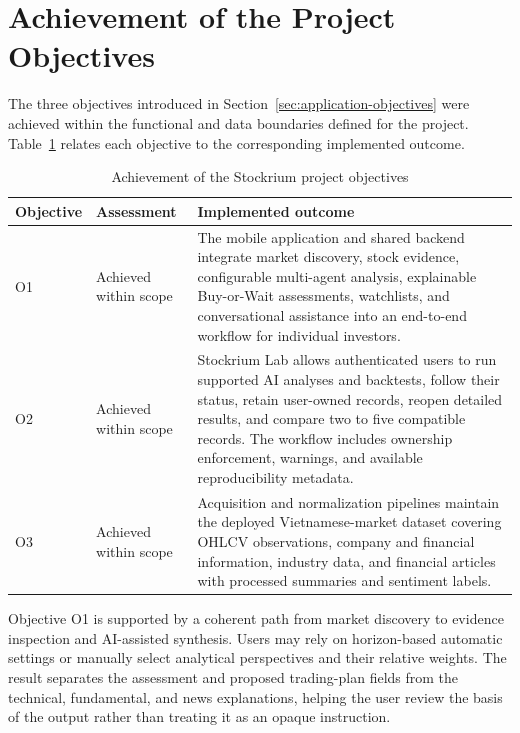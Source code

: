 \section{Achievement of the Project Objectives}
\label{sec:objective-achievement}

The three objectives introduced in Section~\ref{sec:application-objectives} were achieved within the functional and data boundaries defined for the project. Table~\ref{tab:objective-achievement} relates each objective to the corresponding implemented outcome.

\begin{table}[H]
    \centering
    \caption{Achievement of the Stockrium project objectives}
    \label{tab:objective-achievement}
    \begin{tabularx}{\textwidth}{p{1.85cm} p{3.2cm} X}
        \toprule
        \textbf{Objective} & \textbf{Assessment} & \textbf{Implemented outcome} \\
        \midrule
        O1 & Achieved within scope & The mobile application and shared backend integrate market discovery, stock evidence, configurable multi-agent analysis, explainable Buy-or-Wait assessments, watchlists, and conversational assistance into an end-to-end workflow for individual investors. \\
        O2 & Achieved within scope & Stockrium Lab allows authenticated users to run supported AI analyses and backtests, follow their status, retain user-owned records, reopen detailed results, and compare two to five compatible records. The workflow includes ownership enforcement, warnings, and available reproducibility metadata. \\
        O3 & Achieved within scope & Acquisition and normalization pipelines maintain the deployed Vietnamese-market dataset covering OHLCV observations, company and financial information, industry data, and financial articles with processed summaries and sentiment labels. \\
        \bottomrule
    \end{tabularx}
\end{table}

Objective O1 is supported by a coherent path from market discovery to evidence inspection and AI-assisted synthesis. Users may rely on horizon-based automatic settings or manually select analytical perspectives and their relative weights. The result separates the assessment and proposed trading-plan fields from the technical, fundamental, and news explanations, helping the user review the basis of the output rather than treating it as an opaque instruction.

